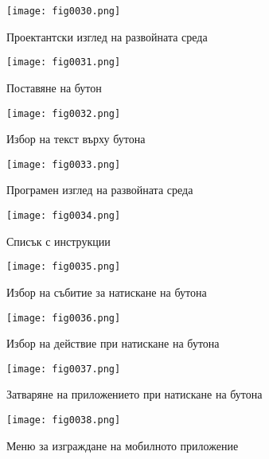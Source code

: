 \begin{figure}[H]
  \centering
  \texttt{[image: fig0030.png]}
  \caption{Проектантски изглед на развойната среда}
\label{fig0030}
\end{figure}

\begin{figure}[H]
  \centering
  \texttt{[image: fig0031.png]}
  \caption{Поставяне на бутон}
\label{fig0031}
\end{figure}

\begin{figure}[H]
  \centering
  \texttt{[image: fig0032.png]}
  \caption{Избор на текст върху бутона}
\label{fig0032}
\end{figure}

\begin{figure}[H]
  \centering
  \texttt{[image: fig0033.png]}
  \caption{Програмен изглед на развойната среда}
\label{fig0033}
\end{figure}

\begin{figure}[H]
  \centering
  \texttt{[image: fig0034.png]}
  \caption{Списък с инструкции}
\label{fig0034}
\end{figure}

\begin{figure}[H]
  \centering
  \texttt{[image: fig0035.png]}
  \caption{Избор на събитие за натискане на бутона}
\label{fig0035}
\end{figure}

\begin{figure}[H]
  \centering
  \texttt{[image: fig0036.png]}
  \caption{Избор на действие при натискане на бутона}
\label{fig0036}
\end{figure}

\begin{figure}[H]
  \centering
  \texttt{[image: fig0037.png]}
  \caption{Затваряне на приложението при натискане на бутона}
\label{fig0037}
\end{figure}

\begin{figure}[H]
  \centering
  \texttt{[image: fig0038.png]}
  \caption{Меню за изграждане на мобилното приложение}
\label{fig0038}
\end{figure}

